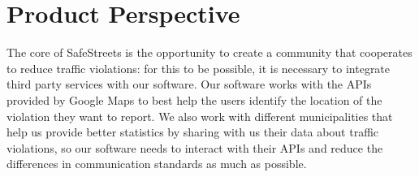 \section{Product Perspective}
The core of SafeStreets is the opportunity to create a community that cooperates to reduce traffic violations: for this to be possible, it is necessary to integrate third party services with our software. 
Our software works with the APIs provided by Google Maps to best help the users identify the location of the violation they want to report.
We also work with different municipalities that help us provide better statistics by sharing with us their data about traffic violations, so our software needs to interact with their APIs and reduce the differences in communication standards as much as possible.